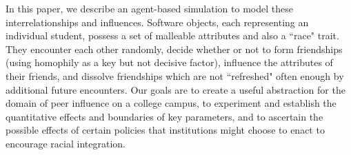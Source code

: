 In this paper, we describe an agent-based simulation to model these
interrelationships and influences. Software objects, each representing an
individual student, possess a set of malleable attributes and also a ``race"
trait. They encounter each other randomly, decide whether or not to form
friendships (using homophily as a key but not decisive factor), influence the
attributes of their friends, and dissolve friendships which are not
``refreshed" often enough by additional future encounters. Our goals are to
create a useful abstraction for the domain of peer influence on a college
campus, to experiment and establish the quantitative effects and boundaries of
key parameters, and to ascertain the possible effects of certain policies
that institutions might choose to enact to encourage racial integration.
